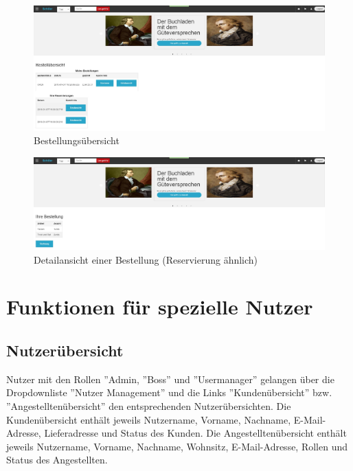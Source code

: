 \documentclass[a4paper]{article}
\begin{document}
\begin{figure}[ht]
\centering
\includegraphics[width=1.0\textwidth]{Bestellungen.jpg}
\caption{Bestellungsübersicht}
\end{figure}
\smallskip

\begin{figure}[ht] 
\centering
\includegraphics[width=1.0\textwidth]{Bestellungsdetail.jpg}
\caption{Detailansicht einer Bestellung (Reservierung ähnlich)}
\end{figure}
\smallskip

\FloatBarrier

\newpage

\section{Funktionen für spezielle Nutzer}

\subsection{Nutzerübersicht} \label{nutzer}

Nutzer mit den Rollen ''Admin, ''Boss'' und ''Usermanager'' gelangen über die Dropdownliste ''Nutzer Management'' und die Links ''Kundenübersicht'' bzw. ''Angestelltenübersicht'' den entsprechenden Nutzerübersichten. Die Kundenübersicht enthält jeweils Nutzername, Vorname, Nachname, E-Mail-Adresse, Lieferadresse und Status des Kunden. Die Angestelltenübersicht enthält jeweils Nutzername, Vorname, Nachname, Wohnsitz, E-Mail-Adresse, Rollen und Status des Angestellten.
\end{document}
